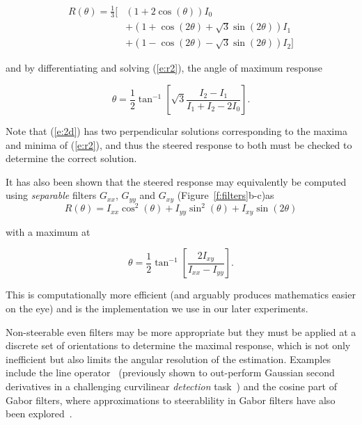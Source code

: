 \documentclass[runningheads,a4paper]{llncs}
\newcommand{\fref}[1]{Figure~\ref{#1}}
\newcommand{\eref}[1]{(\ref{#1})}
\def\Gx{G_x}
\def\Gy{G_y}
\def\Gxx{G_{xx}}
\def\Gxy{G_{xy}} \def\Gyx{G_{yx}}
\def\Gyy{G_{yy}}
\def\Ixx{I_{xx}}
\def\Ixy{I_{xy}}
\def\Iyy{I_{yy}}
\newcommand{\comment}[1]{}
\begin{document}
\begin{align}
R(\theta) = \frac{1}{3}\Big[ %
    &  \left(1 + 2\cos(\theta) \right)I_0 \nonumber \\
    &+ \left(1 + \cos(2\theta) + \sqrt{3}\sin(2\theta)\right)I_1  \nonumber \\
    &+ \left(1 - \cos(2\theta) - \sqrt{3}\sin(2\theta)\right)I_2 \Big] \label{e:r2} %
\end{align}

\noindent and by differentiating and solving \eref{e:r2}, the angle of maximum response

\begin{equation}
\theta = \frac{1}{2}\tan^{-1}\left[ \sqrt{3} \frac{I_2 - I_1}{I_1 + I_2 - 2I_0} \right].
\label{e:2d}
\end{equation}

Note that \eref{e:2d} has two perpendicular solutions corresponding to the maxima and minima of \eref{e:r2}, and thus the steered response to both must be checked to determine the correct solution.

It has also been shown that the steered response may equivalently be computed using \emph{separable} filters $\Gxx$, $\Gyy$ and $\Gxy$ (\fref{f:filters}b-c)as
\begin{equation}
R(\theta) = \Ixx \cos^2(\theta) + \Iyy \sin^2(\theta) + \Ixy \sin(2\theta)
\label{e:r2s}
\end{equation}
\comment{this can also be derived from the Hessian matrix equation}

\noindent with a maximum at

\begin{equation}
\theta = \frac{1}{2}\tan^{-1}\left[ \frac{2\Ixy}{\Ixx-\Iyy} \right].
\label{e:2ds}
\end{equation}

This is computationally more efficient (and arguably produces mathematics easier on the eye) and is the implementation we use in our later experiments.

\comment{I think we can remove this paragraph - it's not so relevant any more.}

Non-steerable even filters may be more appropriate but they must be applied at a discrete set of orientations to determine the maximal response, which is not only inefficient but also limits the angular resolution of the estimation. Examples include the line operator~\cite{Dixon_Taylor_IPC79} (previously shown to out-perform Gaussian second derivatives in a challenging curvilinear \emph{detection} task~\cite{Zwiggelaar_etal_TMI04}) and the cosine part of Gabor filters, where approximations to steerablility in Gabor filters have also been explored~\cite{Teo_1987,Perona_PAMI95}.
\end{document}
